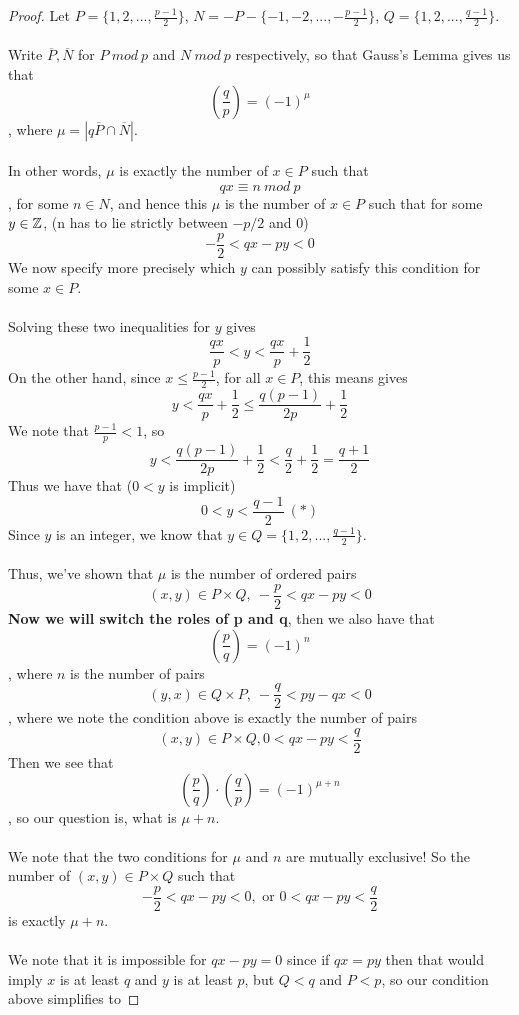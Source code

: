 \begin{proof}
Let $P = \{1, 2, ..., \frac{p-1}{2}\}$, $N = -P - \{-1, -2, ..., -\frac{p-1}{2}\}$, $Q = \{1, 2, ..., \frac{q-1}{2}\}$.\\\\
Write $\overline{P}, \overline{N}$ for $P\ mod\ p$ and $N\ mod\ p$ respectively, so that Gauss's Lemma gives us that
\[(\frac{q}{p}) = (-1)^{\mu}\]
, where $\mu = |q \overline{P} \cap \overline{N}|$.\\\\
In other words, $\mu$ is exactly the number of $x \in P$ such that
\[qx \equiv n\ mod\ p\]
, for some $n \in N$, and hence this $\mu$ is the number of $x \in P$ such that for some $y \in \mathbb{Z}$, (n has to lie strictly between $-p/2$ and $0$)
\[-\frac{p}{2} < qx - py < 0\]
We now specify more precisely which $y$ can possibly satisfy this condition for some $x \in P$.\\\\
Solving these two inequalities for $y$ gives
\[\frac{qx}{p} < y < \frac{qx}{p} + \frac{1}{2}\]
On the other hand, since $x \leq \frac{p-1}{2}$, for all $x \in P$, this means gives
\[y < \frac{qx}{p} + \frac{1}{2} \leq \frac{q(p-1)}{2p} + \frac{1}{2}\]
We note that $\frac{p-1}{p} < 1$, so
\[y < \frac{q(p-1)}{2p} + \frac{1}{2} < \frac{q}{2} + \frac{1}{2} = \frac{q+1}{2}\]
Thus we have that ($0 < y$ is implicit)
\[0 < y < \frac{q-1}{2}\ (*)\]
Since $y$ is an integer, we know that $y \in Q = \{1, 2, ..., \frac{q-1}{2}\}$.\\\\
Thus, we've shown that $\mu$ is the number of ordered pairs
\[(x, y) \in P \times Q,\ -\frac{p}{2} < qx - py < 0\]
{\bf Now we will switch the roles of p and q}, then we also have that 
\[(\frac{p}{q}) = (-1)^{n}\]
, where $n$ is the number of pairs
\[(y, x) \in Q \times P,\ -\frac{q}{2} < py - qx < 0\]
, where we note the condition above is exactly the number of pairs
\[(x, y) \in P \times Q, 0 < qx - py < \frac{q}{2}\]
Then we see that
\[(\frac{p}{q}) \cdot (\frac{q}{p}) = (-1)^{\mu + n}\]
, so our question is, what is $\mu + n$.\\\\
We note that the two conditions for $\mu$ and $n$ are mutually exclusive! So the number of $(x, y) \in P \times Q$ such that
\[-\frac{p}{2} < qx - py < 0, \text{ or } 0 < qx - py < \frac{q}{2}\]
is exactly $\mu + n$.\\\\
We note that it is impossible for $qx - py = 0$ since if $qx = py$ then that would imply $x$ is at least $q$ and $y$ is at least $p$, but $Q < q$ and $P < p$, so our condition above simplifies to

\end{proof}

